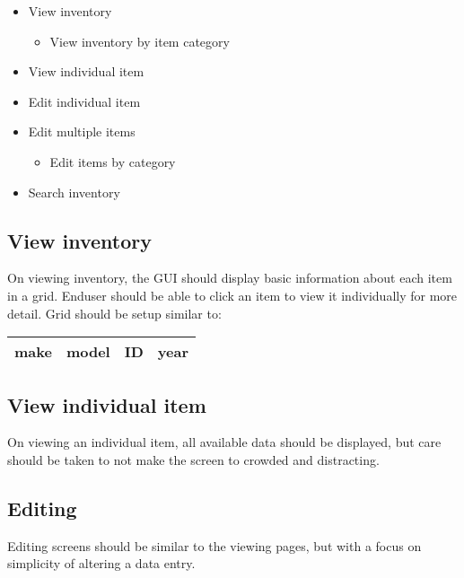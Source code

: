 \documentclass[titlepage]{article}
\begin{document}
            \begin{itemize}
                \item
                View inventory
                    \begin{itemize}
                        \item
                        View inventory by item category
                    \end{itemize}
                
                \item
                View individual item
                
                \item
                Edit individual item
                
                \item
                Edit multiple items
                    \begin{itemize}
                        \item
                        Edit items by category
                    \end{itemize}
                
                \item
                Search inventory
            \end{itemize}
            
        \subsection{View inventory}
            On viewing inventory, the GUI should display basic information about each item
            in a grid. Enduser should be able to click an item to view it individually for
            more detail. Grid should be setup similar to:
                
            \begin{tabular}{|l|l|l|l|} \hline
                make & model & ID & year \\ \hline
                
            \end{tabular}
            
        \subsection{View individual item}
            On viewing an individual item, all available data should be displayed, but care
            should be taken to not make the screen to crowded and distracting.
        
        \subsection{Editing}
            Editing screens should be similar to the viewing pages, but with a focus on 
            simplicity of altering a data entry.
\end{document}
